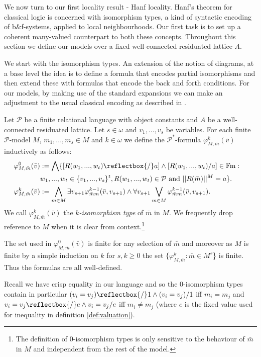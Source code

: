 \documentclass{lmcs} %
\newcommand{\?}{\ensuremath{\mkern0.4\thinmuskip}}
\let\bigland=\bigwedge%
\let\biglor=\bigvee%
\newcommand{\und}{\mathord{\reflectbox{/}}}%
\let\phi=\varphi
\newcommand{\CP}{\mathcal{P}}
\begin{document}
We now turn to our first locality result - Hanf locality. Hanf's theorem for classical logic is concerned with isomorphism types, a kind of syntactic encoding of b\&f-systems, applied to local neighbourhoods. Our first task is to set up a coherent many-valued counterpart to both these concepts. Throughout this section we define our models over a fixed well-connected residuated lattice $A$.

We start with the isomorphism types. An extension of the notion of diagrams, at a base level the idea is to define a formula that encodes partial isomorphisms and then extend these with formulas that encode the back and forth conditions. For our models, by making use of the standard expansions we can make an adjustment to the usual classical encoding as described in \cite{EbbinghausFlum95:Finmodeltheory}. 

\begin{defi}
    Let $\CP$ be a finite relational language with object constants and $A$ be a well-connected residuated lattice. Let $s\in\omega$ and $v_1,...,v_s$ be variables. For each finite $\CP$-model $M$, $m_1,...,m_s\in M$ and $k\in\omega$ we define the $\CP^\ast$-formula $\phi^k_{M,\bar{m}}(\bar{v})$ inductively as follows:\begin{align*}
        \phi^0_{M,\bar{m}}(\bar{v})&:= \bigland\{[R(w_1,...,w_t)\und a]\land [R(w_1,...,w_t)/a]\in \mathrm{Fm}:&\\
        & w_1,...,w_t\in\{v_1,...,v_s\}^t, R(w_1,...,w_t)\in \CP \text{ and }||R(\bar{m})||^M=a\}.&\\
        \phi^k_{M,\bar{m}}(\bar{v})&:=\bigland\limits_{m\in M}\exists v_{s+1}\phi^{k-1}_{\bar{m}m}(\bar{v},v_{s+1})\land\forall v_{s+1}\biglor\limits_{m\in M}\phi^{k-1}_{\bar{m}m}(\bar{v},v_{s+1}).&
    \end{align*}
    We call $\phi^k_{M,\bar{m}}(\bar{v})$ the $k$\textit{-isomorphism type} of $\bar{m}$ in $M$. We frequently drop reference to $M$ when it is clear from context.\footnote{The definition of $0$-isomorphism types is only sensitive to the behaviour of $\bar{m}$ in $M$ and independent from the rest of the model.}  
\end{defi}
\begin{rem}
    The set used in $\phi^0_{M,\bar{m}}(\bar{v})$ is finite for any selection of $\bar{m}$ and moreover as $M$ is finite by a simple induction on $k$ for $s,k\geq 0$ the set $\{\phi^k_{M,\bar{m}}:\bar{m}\in M^s$\} is finite. Thus the formulas are all well-defined. 

    Recall we have crisp equality in our language and so the $0$-isomorphism types contain in particular $(v_i=v_j)\und 1\land (v_i=v_j)/1$ iff $m_i=m_j$ and $v_i=v_j\und e\land v_i=v_j/e$ iff $m_i\not=m_j$ (where $e$ is the fixed value used for inequality in definition \ref{def:valuation}).  
\end{rem}
\end{document}
